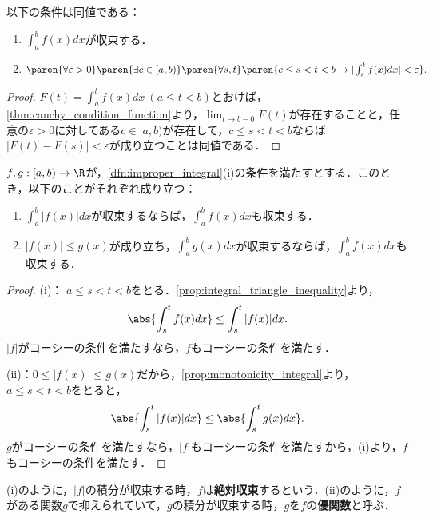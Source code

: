 \documentclass[a4paper,10pt]{ltjsarticle}
\begin{document}
\begin{MyProposition}
  以下の条件は同値である：
  \begin{enumerate}
    \item \(\int_a^b f(x) dx\)が収束する．
    \item \(\paren{\forall \varepsilon > 0}\paren{\exists c \in [a, b)}\paren{\forall s, t}\paren{c \le s < t < b \to |\int_s^t f(x) dx| < \varepsilon}.\)
  \end{enumerate}
\end{MyProposition}
\begin{proof}
  \(F(t)=\int_a^t f(x)dx\ (a\le t<b)\)とおけば，\cref{thm:cauchy_condition_function}より，\(\lim_{t\to b-0}F(t)\)が存在することと，任意の\(\varepsilon > 0\)に対してある\(c \in [a, b)\)が存在して，\(c \le s < t < b\)ならば\(|F(t) - F(s)| < \varepsilon\)が成り立つことは同値である．
\end{proof}

\begin{MyTheorem}
  \(f, g:[a, b) \to \R\)が，\cref{dfn:improper_integral}(i)の条件を満たすとする．このとき，以下のことがそれぞれ成り立つ：
  \begin{enumerate}
    \item \(\int_a^b |f(x)| dx\)が収束するならば，\(\int_a^b f(x) dx\)も収束する．
    \item \(|f(x)| \le g(x)\)が成り立ち，\(\int_a^b g(x) dx\)が収束するならば，\(\int_a^b f(x) dx\)も収束する．
  \end{enumerate}
\end{MyTheorem}
\begin{proof}
  (i)： \(a \le s < t < b\)をとる．\cref{prop:integral_triangle_inequality}より，
  \[ \abs{\int_s^t f(x) dx} \le \int_s^t |f(x)| dx. \]
  \(|f|\)がコーシーの条件を満たすなら，\(f\)もコーシーの条件を満たす．

  (ii)：\(0 \le |f(x)| \le g(x)\)だから，\cref{prop:monotonicity_integral}より，\(a \le s < t < b\)をとると，
  \[ \abs{\int_s^t |f(x)| dx} \le \abs{\int_s^t g(x) dx}. \]
  \(g\)がコーシーの条件を満たすなら，\(|f|\)もコーシーの条件を満たすから，(i)より，\(f\)もコーシーの条件を満たす．
\end{proof}
(i)のように，\(|f|\)の積分が収束する時，\(f\)は\textbf{絶対収束}するという．(ii)のように，\(f\)がある関数\(g\)で抑えられていて，\(g\)の積分が収束する時，\(g\)を\(f\)の\textbf{優関数}と呼ぶ．

\end{document}
